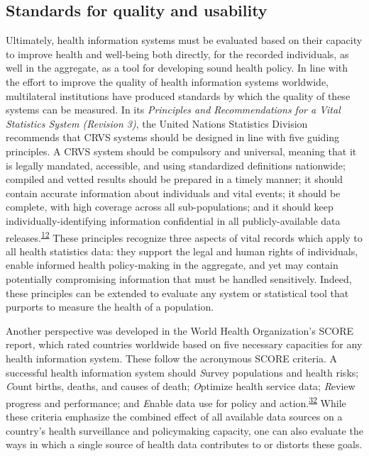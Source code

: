 \documentclass[
]{article}
\begin{document}
\hypertarget{standards-for-quality-and-usability}{%
\subsection{Standards for quality and usability}\label{standards-for-quality-and-usability}}

Ultimately, health information systems must be evaluated based on their capacity to improve health and well-being both directly, for the recorded individuals, as well in the aggregate, as a tool for developing sound health policy. In line with the effort to improve the quality of health information systems worldwide, multilateral institutions have produced standards by which the quality of these systems can be measured. In its \emph{Principles and Recommendations for a Vital Statistics System (Revision 3)}, the United Nations Statistics Division recommends that CRVS systems should be designed in line with five guiding principles. A CRVS system should be compulsory and universal, meaning that it is legally mandated, accessible, and using standardized definitions nationwide; compiled and vetted results should be prepared in a timely manner; it should contain accurate information about individuals and vital events; it should be complete, with high coverage across all sub-populations; and it should keep individually-identifying information confidential in all publicly-available data releases.\textsuperscript{\protect\hyperlink{ref-UnitedNationsStatisticsDivision2014}{12}} These principles recognize three aspects of vital records which apply to all health statistics data: they support the legal and human rights of individuals, enable informed health policy-making in the aggregate, and yet may contain potentially compromising information that must be handled sensitively. Indeed, these principles can be extended to evaluate any system or statistical tool that purports to measure the health of a population.

Another perspective was developed in the World Health Organization's SCORE report, which rated countries worldwide based on five necessary capacities for any health information system. These follow the acronymous SCORE criteria. A successful health information system should \emph{S}urvey populations and health risks; \emph{C}ount births, deaths, and causes of death; \emph{O}ptimize health service data; \emph{R}eview progress and performance; and \emph{E}nable data use for policy and action.\textsuperscript{\protect\hyperlink{ref-WorldHealthOrganization2021}{32}} While these criteria emphasize the combined effect of all available data sources on a country's health surveillance and policymaking capacity, one can also evaluate the ways in which a single source of health data contributes to or distorts these goals.
\end{document}
